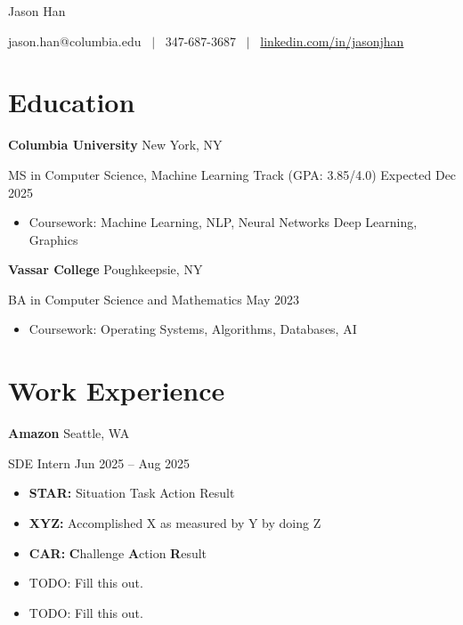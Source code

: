 \documentclass[11pt]{article}
\newcommand{\resumeentry}[4]{%
\textbf{#1} \hfill {\small #2}
\par
{\small #3} \hfill {\small #4}}
\begin{document}
{\centering%
{\huge Jason Han \par}
\medskip
{jason.han@columbia.edu ~$\vert$~ {\small 347-687-3687} ~$\vert$~ \href{https://www.linkedin.com/in/jasonjhan/}{linkedin.com/in/jasonjhan} \par}}

\section{Education}
\resumeentry{Columbia University}{New York, NY}{MS in Computer Science, Machine Learning Track (GPA: 3.85/4.0)}{Expected Dec 2025}
\begin{itemize}
  \item {\small Coursework: Machine Learning, NLP, Neural Networks Deep Learning, Graphics}
\end{itemize}

\smallskip

\resumeentry{Vassar College}{Poughkeepsie, NY}{BA in Computer Science and Mathematics}{May 2023}
\begin{itemize}
  \item {\small Coursework: Operating Systems, Algorithms, Databases, AI}
\end{itemize}

\section{Work Experience}
\resumeentry{Amazon}{Seattle, WA}{SDE Intern}{Jun 2025 -- Aug 2025}
\begin{itemize}
  \item \textbf{STAR:} Situation Task Action Result
  \item \textbf{XYZ:} Accomplished X as measured by Y by doing Z
  \item \textbf{CAR:} \textbf{C}hallenge \textbf{A}ction \textbf{R}esult
  \item TODO: Fill this out.
  \item TODO: Fill this out.
\end{itemize}
\end{document}

